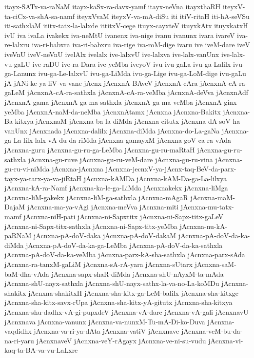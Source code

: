 {itayx-SATx-va-raNaM
itayx-kaSx-ra-davx-yamf
itayx-neVna
itayxthaRH
iteyxV-ta-ciCx-va-shA-sa-namf
iteyxVvaM
iteyxV-va-mA-diSu
iti
itiV-ritaH
iti-hA-seVSu
iti-sathxlaM
ititx-tatx-la-lalxde
ittitxV-cege
ituyx-cayxteV
ituyxkAtx
ituyxkatxH
ivU
iva
ivaLa
ivakekx
iva-neMtU
ivanenx
iva-nige
ivanu
ivanunx
ivara
ivareV
iva-re-lalxru
iva-ri-babxra
iva-ri-babxru
iva-rige
iva-roM-dige
ivaru
ive
iveM-dare
iveV
iveVnU
iveV-neVnU
ivelAlx
ivelalx
ive-lalxvU
ive-lalxva
ive-lalx-vanUnx
ive-lalx-vu-gaLU
ive-raDU
ive-ra-Dara
ive-yeMba
iveyoV
ivu
ivu-gaLa
ivu-ga-Lalilx
ivu-ga-Lanunx
ivu-ga-Le-lalxvU
ivu-ga-LiMda
ivu-ga-Lige
ivu-ga-LoM-dige
ivu-gaLu
jA
jANi-ke-ya-liV-va-vane
jAcnx
jAcnxnA-BAveV
jAcnxnA-cAra
jAcnxnA-cA-ra-gaLeM
jAcnxnA-cA-ra-sathxla
jAcnxnA-cA-ra-veMba
jAcnxnA-deVva
jAcnxnAdf
jAcnxnA-gama
jAcnxnA-ga-ma-sathxla
jAcnxnA-ga-ma-veMba
jAcnxnA-ginx-yeMba
jAcnxnA-naM-da-neMba
jAcnxnAtamx
jAcnxna
jAcnxna-Bakitx
jAcnxna-Ba-kitxya
jAcnxnaM
jAcnxna-ba-la-diMda
jAcnxna-citutx
jAcnxna-dA-soV-ha-vanUnx
jAcnxnada
jAcnxna-dalilx
jAcnxna-diMda
jAcnxna-do-La-gaNa
jAcnxna-ga-La-lilx-lalx-vA-du-da-riMda
jAcnxna-gamayxM
jAcnxna-goV-ca-ra-vAda
jAcnxna-guru
jAcnxna-gu-ru-ga-LeMba
jAcnxna-gu-ru-maRtaH
jAcnxna-gu-ru-sathxla
jAcnxna-gu-ruve
jAcnxna-gu-ru-veM-dare
jAcnxna-gu-ru-vina
jAcnxna-gu-ru-vi-niMda
jAcnxna-jAcnxna
jAcnxna-jecnxV-ya-jAcnx-taq-BeV-da-parx-tayx-ya-tarx-ya-va-jiRtaH
jAcnxna-kAMDa
jAcnxna-kAM-Da-ga-La-lilxya
jAcnxna-kA-ra-Namf
jAcnxna-ka-le-ga-LiMda
jAcnxnakekx
jAcnxna-liMga
jAcnxna-liM-gakekx
jAcnxna-liM-ga-sathxla
jAcnxna-mAgaR
jAcnxna-maM-DajaM
jAcnxna-ma-ya-vAgi
jAcnxna-meVva
jAcnxna-miti
jAcnxna-mu-tatx-mamf
jAcnxna-niH-pati
jAcnxna-ni-Sapxtitx
jAcnxna-ni-Sapx-titx-gaLeV
jAcnxna-ni-Sapx-titx-sathxla
jAcnxna-ni-Sapx-titx-yeMba
jAcnxna-nu-kA-paRNaM
jAcnxna-pA-doV-daka
jAcnxna-pA-doV-dakaM
jAcnxna-pA-doV-da-ka-diMda
jAcnxna-pA-doV-da-ka-ga-LeMba
jAcnxna-pA-doV-da-ka-sathxla
jAcnxna-pA-doV-da-ka-veMba
jAcnxna-parx-kA-sha-sathxla
jAcnxna-parx-sAda
jAcnxna-ra-tanxM-gaLiM
jAcnxna-sA-rA-yara
jAcnxna-sUtarx
jAcnxna-saM-baM-dha-vAda
jAcnxna-sapx-shaR-diMda
jAcnxna-shU-nAyxM-ta-mAda
jAcnxna-shU-nayx-sathxla
jAcnxna-shU-nayx-sathx-la-va-no-La-koMDu
jAcnxna-shakitx
jAcnxna-shakitxH
jAcnxna-sha-kitx-ga-LeM-balilx
jAcnxna-sha-kitxge
jAcnxna-sha-kitx-savx-rUpa
jAcnxna-sha-kitx-yA-gitutx
jAcnxna-sha-kitxya
jAcnxna-shu-dadhx-vA-gi-pupxdeV
jAcnxna-vA-dare
jAcnxna-vA-gali
jAcnxnavU
jAcnxnava
jAcnxna-vanunx
jAcnxna-va-nunxM-Tu-mA-Di-ko-Duva
jAcnxna-vaqdidhx
jAcnxna-va-ri-ya-dAta
jAcnxna-vatiV
jAcnxnave
jAcnxna-veM-bu-da-na-ri-yaru
jAcnxnaveV
jAcnxna-veY-rAgayx
jAcnxna-ve-ni-su-vudu
jAcnxna-vi-kaq-ta-BA-va-vu-LaLxre
}
